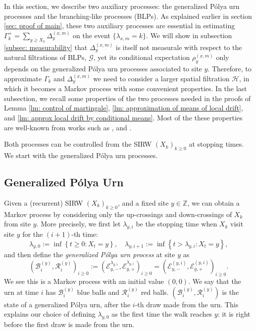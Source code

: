 \documentclass[EJP]{ejpecp} %
\begin{document}
In this section, we describe two auxiliary processes: the generalized P\'{o}lya urn processes and the branching-like processes (BLPs). As explained earlier in section \ref{sec: proof of main}, these two auxiliary processes are essential in estimating $\Gamma_k^+= \sum_{y\geq X_k} \Delta_{y}^{(x,m)}$ on the event $\{\lambda_{x,m} = k\}$. We will show in subsection \ref{subsec: measurability} that $\Delta^{(x,m)}_{y}$ is itself not measurale with respect to the natural filtrations of BLPs, $\mathcal{G}$, yet its conditional expectation $\rho^{(x,m)}_{y}$ only depends on the generalized P\'{o}lya urn processes associated to site $y$. Therefore, to approximate $\Gamma_k$ and $\Delta_{y}^{(x,m)}$ we need to consider a larger spatial filtration $\mathcal{H}$, in which it becomes a Markov process with some convenient properties. In the last subsection, we recall some properties of the two processes needed in the proofs of Lemma \ref{lm: control of martingale}, \ref{lm: approximation of means of local drift}, and \ref{lm: approx local drift by conditional means}. Most of the these properties are well-known from works such as \cite{T96}, \cite{KP16} and \cite{KMP23}. 

Both processes can be controlled from the SIRW $(X_k)_{k\geq 0}$ at stopping times. We start with the generalized P\'{o}lya urn processes. 

\subsection{Generalized P\'{o}lya Urn}
Given a (recurrent) SIRW $(X_k)_{k\geq 0}$, and a fixed site $y\in \mathbb{Z}$, we can obtain a Markov process by considering only the up-crossings and down-crossings of $X_k$ from site $y$. More precisely, we first let $\lambda_{y,i}$ be the stopping time when $X_k$ visit site $y$ for the $\left( i+1 \right) $-th time:
\[
\lambda_{y,0} :=\inf\left\{ t\geq 0: X_t = y \right\} , \quad \lambda_{y,i+1} := \inf\left\{ t> \lambda_{y, i}: X_t = y \right\},
\] 
and then define the \textit{generalized P\'olya urn process} at site $y$ as 
\begin{equation} \label{eq: RW to GPU}
	\left(\mathscr{B}^{(y)}_{i},\mathscr{R}^{(y)}_{i} \right)_{i\ge 0}
	:=\left(\mathcal{E}^{\lambda_{y,i}}_{y,-}, \mathcal{E}^{\lambda_{y,i}}_{y,+}\right)_{i\geq 0} 
	=  \left(\mathcal{E}^{(y,i)}_{y,-}, \mathcal{E}^{(y,i)}_{y,+}\right)_{i\geq 0}.
\end{equation}
We see this is a Markov process with an initial value $(0,0)$. 
We say that the urn at time $i$ has $\mathscr{B}_i^{(y)}$ blue balls and $\mathscr{R}_i^{(y)}$ red balls.
$\left(\mathscr{B}_{i}^{(y)},\mathscr{R}_{i}^{(y)} \right)$ is the state of a generalized P\'olya urn, after the $i$-th draw made from the urn. This explains our choice of defining $\lambda_{y, 0}$ as the first time the walk reaches $y$: it is right before the first draw is made from the urn. 
\end{document}
